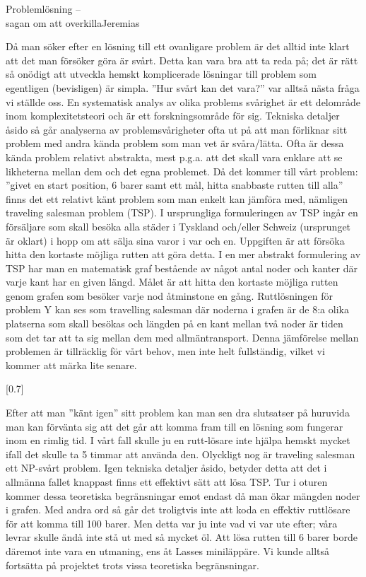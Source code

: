 \documentclass{spektraklet}
\begin{document}
\begin{artikel}{Problemlösning – \\ sagan om att overkilla}{Jeremias}
\begin{twocolumns}
Då man söker efter en lösning till ett ovanligare problem är det alltid inte klart att det man försöker göra är svårt. Detta kan vara bra att ta reda på;  det är rätt så onödigt att utveckla hemskt komplicerade lösningar till problem som egentligen (bevisligen) är simpla. ”Hur svårt kan det vara?” var alltså nästa fråga vi ställde oss. En systematisk analys av olika problems svårighet är ett delområde inom komplexitetsteori och är ett forskningsområde för sig. Tekniska detaljer åsido så går analyserna av problemsvårigheter ofta ut på att man förliknar sitt problem med andra kända problem som man vet är svåra/lätta. Ofta är dessa kända problem relativt abstrakta, mest p.g.a. att det skall vara enklare att se likheterna mellan dem och det egna problemet. Då det kommer till vårt problem: ”givet en start position, 6 barer samt ett mål, hitta snabbaste rutten till alla” finns det ett relativt känt problem som man enkelt kan jämföra med, nämligen traveling salesman problem (TSP). I ursprungliga formuleringen av TSP ingår en försäljare som skall besöka alla städer i Tyskland och/eller Schweiz (ursprunget är oklart) i hopp om att sälja sina varor i var och en. Uppgiften är att försöka hitta den kortaste möjliga rutten att göra detta. I en mer abstrakt formulering av TSP  har man en matematisk graf bestående av något antal noder och kanter där varje kant har en given längd. Målet är att hitta den kortaste möjliga rutten genom grafen som besöker varje nod åtminstone en gång. Ruttlösningen för problem Y kan ses som travelling salesman där noderna i grafen är de 8:a olika platserna som skall besökas och längden på en kant mellan två noder är tiden som det tar att ta sig mellan dem med allmäntransport. Denna jämförelse mellan problemen är tillräcklig för vårt behov, men inte helt fullständig, vilket vi kommer att märka lite senare.

[0.7\columnwidth]

Efter att man ”känt igen” sitt problem kan man sen dra slutsatser på huruvida man kan förvänta sig att det går att komma fram till en lösning som fungerar inom en rimlig tid. I vårt fall skulle ju en rutt-lösare inte hjälpa hemskt mycket ifall det skulle ta 5 timmar att använda den. Olyckligt nog är traveling salesman ett NP-svårt problem. Igen tekniska detaljer åsido, betyder detta att det i allmänna fallet knappast finns ett effektivt sätt att lösa TSP. Tur i oturen kommer dessa teoretiska begränsningar emot endast då man ökar mängden noder i grafen. Med andra ord så går det troligtvis inte att koda en effektiv ruttlösare för att komma till 100 barer. Men detta var ju inte vad vi var ute efter; våra levrar skulle ändå  inte stå ut med så mycket öl. Att lösa rutten till 6 barer borde däremot inte vara en utmaning, ens åt Lasses miniläppäre. Vi kunde alltså fortsätta på projektet trots vissa teoretiska begränsningar.


\end{twocolumns}
\end{artikel}
\end{document}
